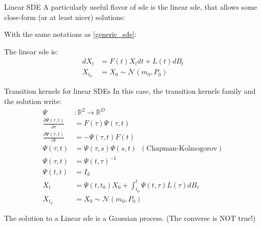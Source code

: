 \begin{frame}{Linear SDE}
    A particularly useful flavor of \gls{sde} is the linear \gls{sde}, that allows some close-form (or at least nicer) solutions:

    \begin{definition}
        With the same notations as \ref{generic_sde}:

        The linear \gls{sde} is:
        \begin{align}
            \label{linear_sde}
            dX_t &= F(t) X_t dt + L(t) dB_t \\
            X_{t_0} &= X_0 \sim \mathcal{N}(m_0, P_0)
        \end{align}
    \end{definition}
\end{frame}

\begin{frame}{Transition kernels for linear SDEs}
In this case, the transition kernels family and the solution write:
\begin{align}
    \Psi &: \mathbb{R}^{2 } \rightarrow \mathbb{R}^{D} \\
    \frac{\partial \Psi (\tau, t)}{\partial \tau} &= F(\tau) \Psi(\tau, t) \\
    \frac{\partial \Psi (\tau, t)}{\partial t} &= - \Psi(\tau, t) F(t)  \\
    \Psi(\tau, t) &= \Psi(\tau, s) \Psi(s, t) \,\,\, (\text{Chapman-Kolmogorov}) \\
    \Psi(\tau, t) &= \Psi(t, \tau)^{-1} \\ 
    \Psi(t,t) &= I_d \\
    \label{solution_linear_sde}
    X_t &= \Psi(t,t_0) X_0 + \int_{t_0}^{t} \Psi(t, \tau) L(\tau) dB_{\tau} \\
    X_{t_0} &= X_0 \sim \mathcal{N}(m_0, P_0)
\end{align}

\begin{tcolorbox}[colback=blue!5!white,colframe=black!75!black]
    The solution to a Linear \gls{sde} is a Gaussian process. (The converse is NOT true!)
\end{tcolorbox}
\end{frame}

